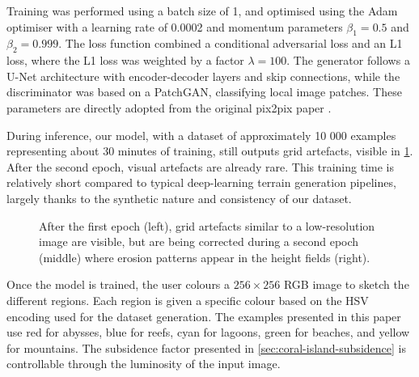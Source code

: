 Training was performed using a batch size of 1, and optimised using the Adam optimiser with a learning rate of 0.0002 and momentum parameters $\beta_1 = 0.5$ and $\beta_2 = 0.999$. The loss function combined a conditional adversarial loss and an L1 loss, where the L1 loss was weighted by a factor $\lambda = 100$. The generator follows a U-Net architecture with encoder-decoder layers and skip connections, while the discriminator was based on a PatchGAN, classifying local image patches. These parameters are directly adopted from the original pix2pix paper \cite{Isola2017}.

During inference, our model, with a dataset of approximately 10 000 examples representing about 30 minutes of training, still outputs grid artefacts, visible in \cref{fig:coral-island-first-epoch}. After the second epoch, visual artefacts are already rare. This training time is relatively short compared to typical deep-learning terrain generation pipelines, largely thanks to the synthetic nature and consistency of our dataset.

\begin{figure}[t]
    \caption{After the first epoch (left), grid artefacts similar to a low-resolution image are visible, but are being corrected during a second epoch (middle) where erosion patterns appear in the height fields (right).}
    \label{fig:coral-island-first-epoch}
\end{figure}

Once the model is trained, the user colours a $256\times256$ RGB image to sketch the different regions. Each region is given a specific colour based on the HSV encoding used for the dataset generation. The examples presented in this paper use red for abysses, blue for reefs, cyan for lagoons, green for beaches, and yellow for mountains. The subsidence factor presented in \cref{sec:coral-island-subsidence} is controllable through the luminosity of the input image.

